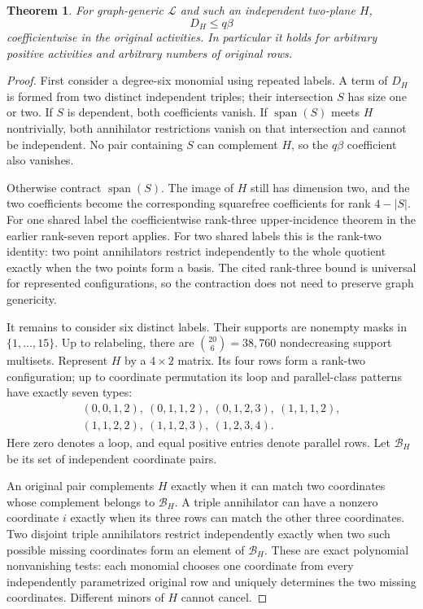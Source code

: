 \documentclass[11pt,a4paper]{article}
\newtheorem{theorem}{Theorem}[section]
\theoremstyle{remark}\newtheorem{remark}[theorem]{Remark}
\newcommand{\spn}{\operatorname{span}}     %
\begin{document}
\begin{theorem}\label{mrn:e:ff:thm:upper}
For graph-generic $\mathcal L$ and such an independent two-plane $H$,
\begin{equation}\label{mrn:e:ff:eq:upper}
 D_H\le q\beta
\end{equation}
coefficientwise in the original activities. In particular it holds for arbitrary positive activities and arbitrary numbers of original rows.
\end{theorem}
\begin{proof}
First consider a degree-six monomial using repeated labels. A term of $D_H$ is formed from two distinct independent triples; their intersection $S$ has size one or two. If $S$ is dependent, both coefficients vanish. If $\spn(S)$ meets $H$ nontrivially, both annihilator restrictions vanish on that intersection and cannot be independent. No pair containing $S$ can complement $H$, so the $q\beta$ coefficient also vanishes.

Otherwise contract $\spn(S)$. The image of $H$ still has dimension two, and the two coefficients become the corresponding squarefree coefficients for rank $4-|S|$. For one shared label the coefficientwise rank-three upper-incidence theorem in the earlier rank-seven report applies. For two shared labels this is the rank-two identity: two point annihilators restrict independently to the whole quotient exactly when the two points form a basis. The cited rank-three bound is universal for represented configurations, so the contraction does not need to preserve graph genericity.

It remains to consider six distinct labels. Their supports are nonempty masks in $\{1,\ldots,15\}$. Up to relabeling, there are $\binom{20}{6}=38{,}760$ nondecreasing support multisets. Represent $H$ by a $4\times2$ matrix. Its four rows form a rank-two configuration; up to coordinate permutation its loop and parallel-class patterns have exactly seven types:
\begin{equation}\label{mrn:e:ff:eq:types}
 \begin{gathered}
 (0,0,1,2),\ (0,1,1,2),\ (0,1,2,3),\ (1,1,1,2),\\
 (1,1,2,2),\ (1,1,2,3),\ (1,2,3,4).
 \end{gathered}
\end{equation}
Here zero denotes a loop, and equal positive entries denote parallel rows. Let $\mathcal B_H$ be its set of independent coordinate pairs.

An original pair complements $H$ exactly when it can match two coordinates whose complement belongs to $\mathcal B_H$. A triple annihilator can have a nonzero coordinate $i$ exactly when its three rows can match the other three coordinates. Two disjoint triple annihilators restrict independently exactly when two such possible missing coordinates form an element of $\mathcal B_H$. These are exact polynomial nonvanishing tests: each monomial chooses one coordinate from every independently parametrized original row and uniquely determines the two missing coordinates. Different minors of $H$ cannot cancel.


\end{proof}
\end{document}
